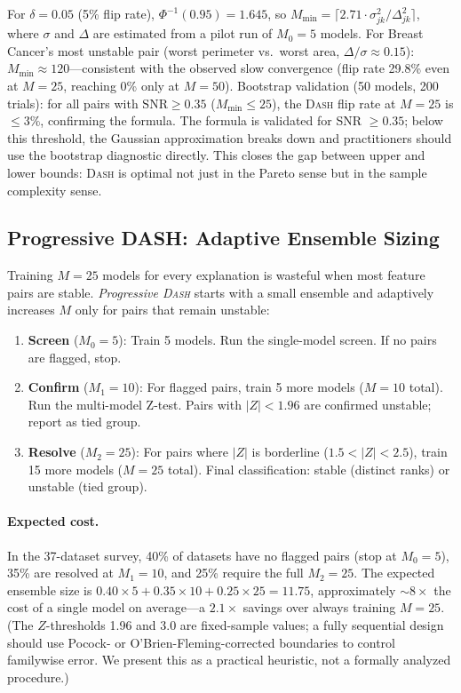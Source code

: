 \documentclass{article}
\newcommand{\DASH}{\textsc{Dash}}
\begin{document}
For $\delta = 0.05$ (5\% flip rate), $\Phi^{-1}(0.95) = 1.645$, so $M_{\min} = \lceil 2.71 \cdot \sigma_{jk}^2/\Delta_{jk}^2 \rceil$, where $\sigma$ and $\Delta$ are estimated from a pilot run of $M_0 = 5$ models. For Breast Cancer's most unstable pair (worst perimeter vs.\ worst area, $\Delta/\sigma \approx 0.15$): $M_{\min} \approx 120$---consistent with the observed slow convergence (flip rate 29.8\% even at $M = 25$, reaching 0\% only at $M = 50$). Bootstrap validation (50 models, 200 trials): for all pairs with $\text{SNR} \geq 0.35$ ($M_{\min} \leq 25$), the \DASH{} flip rate at $M = 25$ is $\leq 3\%$, confirming the formula. The formula is validated for SNR $\geq 0.35$; below this threshold, the Gaussian approximation breaks down and practitioners should use the bootstrap diagnostic directly. This closes the gap between upper and lower bounds: \DASH{} is optimal not just in the Pareto sense but in the sample complexity sense.

\subsection{Progressive DASH: Adaptive Ensemble Sizing}
\label{sec:progressive-dash}

Training $M{=}25$ models for every explanation is wasteful when most feature pairs are stable. \emph{Progressive \DASH{}} starts with a small ensemble and adaptively increases $M$ only for pairs that remain unstable:

\begin{enumerate}
    \item \textbf{Screen} ($M_0 = 5$): Train 5 models. Run the single-model screen. If no pairs are flagged, stop.
    \item \textbf{Confirm} ($M_1 = 10$): For flagged pairs, train 5 more models ($M = 10$ total). Run the multi-model Z-test. Pairs with $|Z| < 1.96$ are confirmed unstable; report as tied group.
    \item \textbf{Resolve} ($M_2 = 25$): For pairs where $|Z|$ is borderline ($1.5 < |Z| < 2.5$), train 15 more models ($M = 25$ total). Final classification: stable (distinct ranks) or unstable (tied group).
\end{enumerate}

\paragraph{Expected cost.}
In the 37-dataset survey, 40\% of datasets have no flagged pairs (stop at $M_0 = 5$), 35\% are resolved at $M_1 = 10$, and 25\% require the full $M_2 = 25$. The expected ensemble size is $0.40 \times 5 + 0.35 \times 10 + 0.25 \times 25 = 11.75$, approximately ${\sim}8\times$ the cost of a single model on average---a $2.1\times$ savings over always training $M = 25$.
(The $Z$-thresholds 1.96 and 3.0 are fixed-sample values; a fully sequential design should use Pocock- or O'Brien-Fleming-corrected boundaries to control familywise error. We present this as a practical heuristic, not a formally analyzed procedure.)
\end{document}
